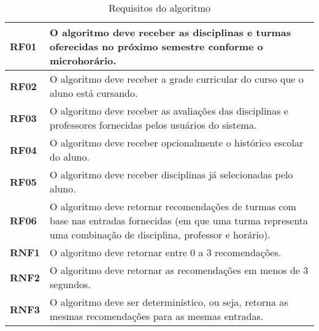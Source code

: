 \begin{table}[!ht]
    \begin{center}
        \begin{tabular}{ | m{} | p{} | }  
            \hline
            \textbf{RF01} & O algoritmo deve receber as disciplinas e turmas oferecidas no próximo semestre conforme o microhorário.\tabularnewline\hline
            \textbf{RF02} & O algoritmo deve receber a grade curricular do curso que o aluno está cursando.\tabularnewline\hline
            \textbf{RF03} & O algoritmo deve receber as avaliações das disciplinas e professores fornecidas pelos usuários do sistema.\tabularnewline\hline
            \textbf{RF04} & O algoritmo deve receber opcionalmente o histórico escolar do aluno.\tabularnewline\hline
            \textbf{RF05} & O algoritmo deve receber disciplinas já selecionadas pelo aluno.\tabularnewline\hline
            \textbf{RF06} & O algoritmo deve retornar recomendações de turmas com base nas entradas fornecidas (em que uma turma representa uma combinação de disciplina, professor e horário).\tabularnewline\hline
            
            
            \textbf{RNF1} & O algoritmo deve retornar entre 0 a 3 recomendações.\tabularnewline\hline
            \textbf{RNF2} & O algoritmo deve retornar as recomendações em menos de 3 segundos.\tabularnewline\hline
            \textbf{RNF3} & O algoritmo deve ser determinístico, ou seja, retorna as mesmas recomendações para as mesmas entradas.\tabularnewline\hline
        \end{tabular}
    \end{center}
    \caption{Requisitos do algoritmo}
    
    \label{tab:req-algoritmo}
\end{table}


